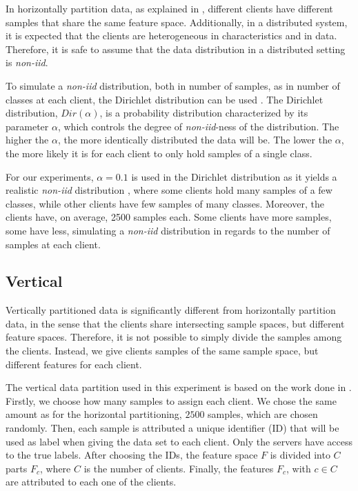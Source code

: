 In horizontally partition data, as explained in , different clients have different samples that share the same feature space. Additionally, in a distributed system, it is expected that the clients are heterogeneous in characteristics and in data. Therefore, it is safe to assume that the data distribution in a distributed setting is \textit{non-iid}.

To simulate a \textit{non-iid} distribution, both in number of samples, as in number of classes at each client, the Dirichlet distribution can be used \cite{tim, 10.48550/arxiv.2006.07242}. The Dirichlet distribution, $Dir(\alpha)$, is a probability distribution characterized by its parameter $\alpha$, which controls the degree of \textit{non-iid}-ness of the distribution. The higher the $\alpha$, the more identically distributed the data will be. The lower the $\alpha$, the more likely it is for each client to only hold samples of a single class.

For our experiments, $\alpha = 0.1$ is used in the Dirichlet distribution as it yields a realistic \textit{non-iid} distribution \cite{10.48550/arxiv.2006.07242}, where some clients hold many samples of a few classes, while other clients have few samples of many classes. Moreover, the clients have, on average, 2500 samples each. Some clients have more samples, some have less, simulating a \textit{non-iid} distribution in regards to the number of samples at each client.

\subsection{Vertical}\label{subsection:verticalpartitioning}

Vertically partitioned data is significantly different from horizontally partition data, in the sense that the clients share intersecting sample spaces, but different feature spaces. Therefore, it is not possible to simply divide the samples among the clients. Instead, we give clients samples of the same sample space, but different features for each client.

The vertical data partition used in this experiment is based on the work done in \cite{10.48550/arxiv.2104.00489}. Firstly, we choose how many samples to assign each client. We chose the same amount as for the horizontal partitioning, $2500$ samples, which are chosen randomly. Then, each sample is attributed a unique identifier (ID) that will be used as label when giving the data set to each client. Only the servers have access to the true labels. After choosing the IDs, the feature space $F$ is divided into $C$ parts $F_c$, where $C$ is the number of clients. Finally, the features $F_c$, with $c \in C$ are attributed to each one of the clients.

